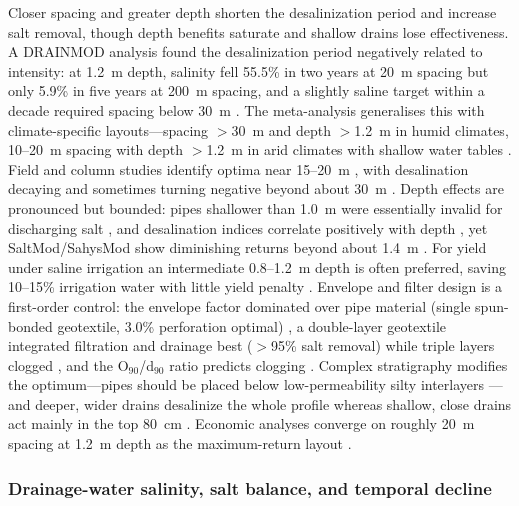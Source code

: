Closer spacing and greater depth shorten the desalinization period and increase
salt removal, though depth benefits saturate and shallow drains lose
effectiveness. A DRAINMOD analysis found the desalinization period negatively
related to intensity: at 1.2~m depth, salinity fell 55.5\% in two years at 20~m
spacing but only 5.9\% in five years at 200~m spacing, and a slightly saline
target within a decade required spacing below 30~m \parencite{Chen2025}. The
meta-analysis generalises this with climate-specific layouts---spacing $>$30~m
and depth $>$1.2~m in humid climates, 10--20~m spacing with depth $>$1.2~m in
arid climates with shallow water tables \parencite{Yang2025}. Field and column
studies identify optima near 15--20~m
\parencite{Wang2020,Wang2025c,Han2023,Chen2022,Yang2022c}, with desalination
decaying and sometimes turning negative beyond about 30~m \parencite{Zhu2025b}.
Depth effects are pronounced but bounded: pipes shallower than 1.0~m were
essentially invalid for discharging salt \parencite{Qian2021b}, and desalination
indices correlate positively with depth
\parencite{Qian2021b,Tian2023c,Tian2024}, yet SaltMod/SahysMod show diminishing
returns beyond about 1.4~m \parencite{Bahçeci2007,Bahçeci2006}. For yield under
saline irrigation an intermediate 0.8--1.2~m depth is often preferred, saving
10--15\% irrigation water with little yield penalty
\parencite{Feng2017,Feng2019,Muhammad2021}. Envelope and filter design is a
first-order control: the envelope factor dominated over pipe material (single
spun-bonded geotextile, 3.0\% perforation optimal) \parencite{Li2022}, a
double-layer geotextile integrated filtration and drainage best ($>$95\% salt
removal) while triple layers clogged \parencite{Wang2024d}, and the
O$_{90}$/d$_{90}$ ratio predicts clogging \parencite{Elzoghby2021}. Complex
stratigraphy modifies the optimum---pipes should be placed below
low-permeability silty interlayers \parencite{Guo2024b,Tian2024}---and deeper,
wider drains desalinize the whole profile whereas shallow, close drains act
mainly in the top 80~cm \parencite{KAMRA1991}. Economic analyses converge on
roughly 20~m spacing at 1.2~m depth as the maximum-return layout
\parencite{Chen2025}.

\subsubsection{Drainage-water salinity, salt balance, and temporal decline}

